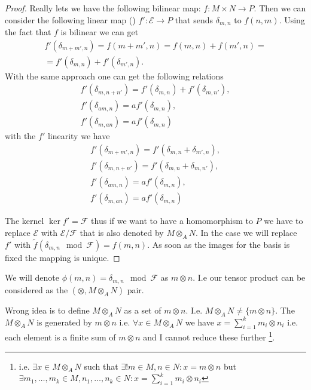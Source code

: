 \begin{lemma}
\begin{proof}
    Really lets we have the following bilinear map:
    $f: M \times N \to P$. Then we can consider the following linear
    map ()
    $f': \mathcal{E} \to P$ that sends $\delta_{m,n}$ to
    $f(n,m)$. Using the fact that $f$ is bilinear we can get
    \begin{eqnarray}
      f'(\delta_{m+m',n}) =
      f(m+m', n) = f(m, n) + f(m', n) =
      \nonumber \\
      =
      f'(\delta_{m,n}) + f'(\delta_{m',n}).
      \nonumber
    \end{eqnarray}
    With the same approach one can get the following relations
    \begin{eqnarray}
      f'(\delta_{m,n+n'}) = f'(\delta_{m,n}) + f'(\delta_{m,n'}),
      \nonumber \\
      f'(\delta_{am,n}) =  a f'(\delta_{m,n}),
      \nonumber \\
      f'(\delta_{m,an}) = a f'(\delta_{m,n})
      \nonumber
    \end{eqnarray}
    with the $f'$ linearity we have
    \begin{eqnarray}
      f'(\delta_{m+m',n}) = f'(\delta_{m,n} + \delta_{m',n}),
      \nonumber \\
      f'(\delta_{m,n+n'}) = f'(\delta_{m,n} + \delta_{m,n'}),
      \nonumber \\
      f'(\delta_{am,n}) =  a f'(\delta_{m,n}),
      \nonumber \\
      f'(\delta_{m,an}) = a f'(\delta_{m,n})
      \nonumber
    \end{eqnarray}

    The kernel $\ker f' = \mathcal{F}$ thus if we want to have a
    homomorphism to $P$ we have to replace $\mathcal{E}$ with
    $\mathcal{E}/\mathcal{F}$ that is also denoted by
    $M \otimes_A N$. In the case we will replace $f'$ with
    $\tilde{f}\left(\delta_{m,n} \mod \mathcal{F}\right) = f(m,n)$. As
    soon as the images for the basis is fixed the mapping is unique.
  \end{proof}
  \label{lem:tensorproductexistence}
\end{lemma}

We will denote $\phi\left(m,n\right) = \delta_{m,n} \mod \mathcal{F}$ as
$m \otimes n$. I.e our tensor product can be considered as the 
$\left(\otimes, M \otimes_A N\right)$ pair.


\begin{remark}
  Wrong idea is to define $M \otimes_A N$
  as a set of $m \otimes n$. I.e.
  $M \otimes_A N \neq \{m \otimes n\}$. The $M \otimes_A N$ is
  generated by $m \otimes n$ i.e. 
  $\forall x \in M \otimes_A N$ we have
  $x = \sum_{i = 1}^k m_i \otimes n_i$ i.e. each element is a finite
  sum of $m \otimes n$ and I cannot reduce these further
  \footnote{
    i.e. $\exists x \in M \otimes_A N$ such that
    $\exists! m \in M, n \in N: x = m \otimes n$ but
    $\exists m_1, \dots, m_k \in M, n_1, \dots, n_k \in N :
    x = \sum_{i = 1}^k m_i \otimes n_i$
  }. 

\end{remark}


